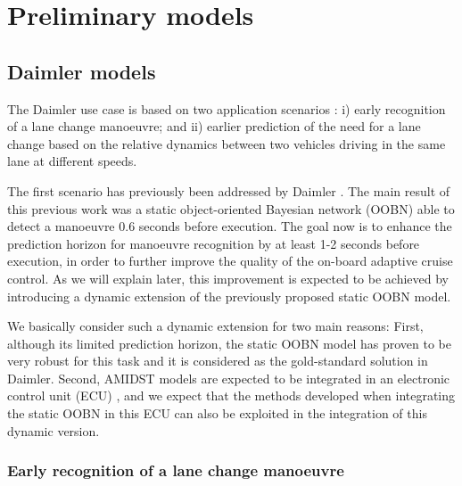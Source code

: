 \section{Preliminary models}\label{Section:PreliminaryModels}

\subsection{Daimler models}\label{Section:DaimlerModels}

The Daimler use case is based on two application scenarios \cite{Fer14}: i) early recognition of a lane change manoeuvre; and ii) earlier prediction of the need for a lane change based on the relative dynamics between two vehicles driving in the same lane at different speeds. 

The first scenario has previously been addressed by Daimler \cite{kasper2012object}. The main result of this previous work was a static object-oriented Bayesian network (OOBN) \cite{KollerPfeffer1997} able to detect a manoeuvre 0.6 seconds before execution. The goal now is to enhance the prediction horizon for manoeuvre recognition by at least 1-2 seconds before execution, in order to further improve the quality of the on-board adaptive cruise control. As we will explain later, this improvement is expected to be achieved by introducing a dynamic extension of the previously proposed static OOBN model. 

We basically consider such a dynamic extension for two main reasons: First, although its limited prediction horizon, the static OOBN model has proven to be very robust for this task and it is considered as the gold-standard solution in Daimler. Second, AMIDST models are expected to be integrated in an electronic control unit (ECU) \cite{Fer14}, and we expect that the methods developed when integrating the static OOBN in this ECU \cite{Weidl2014} can also be exploited in the integration of this dynamic version. 

\subsubsection{Early recognition of a lane change manoeuvre}\label{Section:Daimler:EarlyRecognition}

